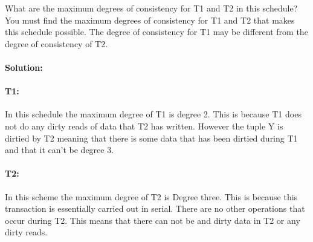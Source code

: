 \documentclass[11pt]{article}
\begin{document}
What are the maximum degrees of consistency for T1 and T2
in this schedule? You must find the maximum degrees of consistency for T1 and T2 that makes this schedule possible.
The degree of consistency for T1 may be different from the degree of consistency of T2.

\paragraph{Solution:} \hfill \break

\paragraph{T1:} \hfill \break
	In this schedule the maximum degree of T1 is degree 2. This is because T1 does not do any dirty reads of data that T2 has written. However the tuple Y is dirtied by T2 meaning that there is some data that has been dirtied during T1 and that it can't be degree 3.\\
	
	
\paragraph{T2:} \hfill \break
In this scheme the maximum degree of T2 is Degree three. This is because this transaction is essentially carried out in serial. There are no other operations that occur during T2. This means that there can not be and dirty data in T2 or any dirty reads.\\
\end{document}
